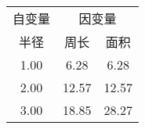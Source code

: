 \documentclass[nofonts]{ctexart}
\begin{document}
\begin{tabular}{|c||cc|}
	\hline
	\hline
	自变量	& \multicolumn{2}{c|}{因变量}	\\
	\cline{2-3}
	半径	& 周长	& 面积	\\
	\hline
	\hline
	1.00	& 6.28	& 6.28	\\
	2.00	& 12.57	& 12.57	\\
	3.00	& 18.85	& 28.27	\\
	\hline
	\hline
\end{tabular}
\end{document}
